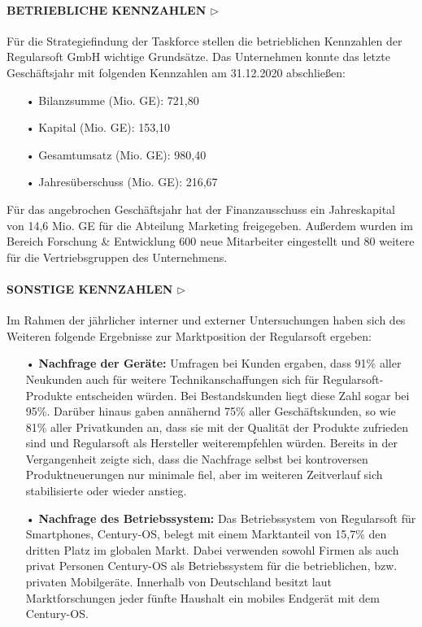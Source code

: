 \documentclass[13pt,titlepage]{article}
\begin{document}
\paragraph{\textbf{BETRIEBLICHE KENNZAHLEN $\triangleright$}}
Für die Strategiefindung der Taskforce stellen die betrieblichen Kennzahlen der Regularsoft GmbH wichtige Grundsätze. Das Unternehmen konnte das letzte Geschäftsjahr mit folgenden Kennzahlen am 31.12.2020 abschließen:
\begin{itemize}
\item[•] Bilanzsumme (Mio. GE):		721,80
\item[•] Kapital (Mio. GE):			153,10
\item[•] Gesamtumsatz (Mio. GE):	980,40
\item[•] Jahresüberschuss (Mio. GE):	216,67
\end{itemize}
Für das angebrochen Geschäftsjahr hat der Finanzausschuss ein Jahreskapital von 14,6  Mio. GE für die Abteilung Marketing freigegeben. Außerdem wurden im Bereich Forschung \& Entwicklung 600 neue Mitarbeiter eingestellt und 80 weitere für die Vertriebsgruppen des Unternehmens.

\paragraph{\textbf{SONSTIGE KENNZAHLEN $\triangleright$}}
Im Rahmen der jährlicher interner und externer Untersuchungen haben sich des Weiteren folgende Ergebnisse zur Marktposition der Regularsoft ergeben:
\begin{itemize}
\item[•] \textbf{Nachfrage der Geräte:}
Umfragen bei Kunden ergaben, dass 91\% aller Neukunden auch für weitere Technikanschaffungen sich für Regularsoft-Produkte entscheiden würden. Bei Bestandskunden liegt diese Zahl sogar bei 95\%. Darüber hinaus gaben annähernd 75\% aller Geschäftskunden, so wie 81\% aller Privatkunden an, dass sie mit der Qualität der Produkte zufrieden sind und Regularsoft als Hersteller weiterempfehlen würden. Bereits in der Vergangenheit zeigte sich, dass die Nachfrage selbst bei kontroversen Produktneuerungen nur minimale fiel, aber im weiteren Zeitverlauf sich stabilisierte oder wieder anstieg.
\item[•] \textbf{Nachfrage des Betriebssystem:}
Das Betriebssystem von Regularsoft für Smartphones, Century-OS, belegt mit einem Marktanteil von 15,7\% den dritten Platz im globalen Markt. Dabei verwenden sowohl Firmen als auch privat Personen Century-OS als Betriebssystem für die betrieblichen, bzw. privaten Mobilgeräte. Innerhalb von Deutschland besitzt laut Marktforschungen jeder fünfte Haushalt ein mobiles Endgerät mit dem Century-OS.
\end{itemize}
\end{document}
